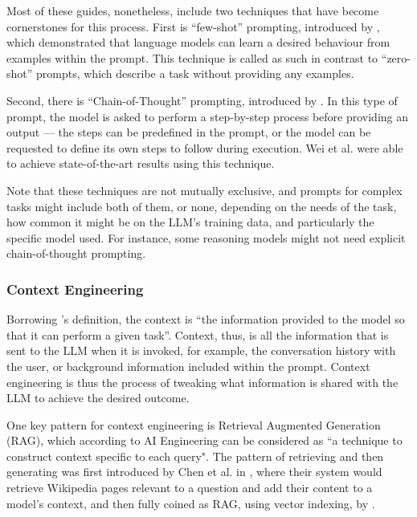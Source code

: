 \documentclass[a4paper]{report}
\begin{document}
Most of these guides, nonetheless, include two techniques that have become cornerstones for this process. First is ``few-shot'' prompting, introduced by \cite{brown2020languagemodelsfewshotlearners}, which demonstrated that language models can learn a desired behaviour from examples within the prompt. This technique is called as such in contrast to ``zero-shot'' prompts, which describe a task without providing any examples.

Second, there is ``Chain-of-Thought'' prompting, introduced by \cite{wei2023chainofthoughtpromptingelicitsreasoning}. In this type of prompt, the model is asked to perform a step-by-step process before providing an output --- the steps can be predefined in the prompt, or the model can be requested to define its own steps to follow during execution. Wei et al. were able to achieve state-of-the-art results using this technique.

Note that these techniques are not mutually exclusive, and prompts for complex tasks might include both of them, or none, depending on the needs of the task, how common it might be on the LLM's training data, and particularly the specific model used. For instance, some reasoning models might not need explicit chain-of-thought prompting.

\subsubsection{Context Engineering}

Borrowing \cite{aiebook2025}'s definition, the context is ``the information provided to the model so that it can perform a given task''. Context, thus, is all the information that is sent to the LLM when it is invoked, for example, the conversation history with the user, or background information included within the prompt. Context engineering is thus the process of tweaking what information is shared with the LLM to achieve the desired outcome.

One key pattern for context engineering is Retrieval Augmented Generation (RAG), which according to AI Engineering can be considered as ``a technique to construct context specific to each query". The pattern of retrieving and then generating was first introduced by Chen et al. in \cite{chen2017readingwikipediaansweropendomain}, where their system would retrieve Wikipedia pages relevant to a question and add their content to a model's context, and then fully coined as RAG, using vector indexing, by \cite{lewis2021retrievalaugmentedgeneration}.
\end{document}
